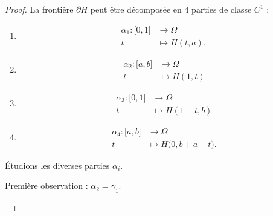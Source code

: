 \begin{proof}
	La frontière \( \partial H\) peut être décomposée en \( 4\) parties de classe \( C^1\) :
	\begin{enumerate}
		\item
		      \begin{equation}
			      \begin{aligned}
				      \alpha_1\colon \mathopen[ 0 , 1 \mathclose] & \to \Omega      \\
				      t                                           & \mapsto H(t,a),
			      \end{aligned}
		      \end{equation}
		\item
		      \begin{equation}
			      \begin{aligned}
				      \alpha_2\colon \mathopen[ a , b \mathclose] & \to \Omega     \\
				      t                                           & \mapsto H(1,t)
			      \end{aligned}
		      \end{equation}
		\item
		      \begin{equation}
			      \begin{aligned}
				      \alpha_3\colon \mathopen[ 0 , 1 \mathclose] & \to \Omega       \\
				      t                                           & \mapsto H(1-t,b)
			      \end{aligned}
		      \end{equation}
		\item
		      \begin{equation}
			      \begin{aligned}
				      \alpha_4\colon \mathopen[ a , b \mathclose] & \to \Omega               \\
				      t                                           & \mapsto H\big(0, b+a-t).
			      \end{aligned}
		      \end{equation}
	\end{enumerate}
	Étudions les diverses parties \( \alpha_i\).
	\begin{subproof}
		Première observation : \( \alpha_2=\gamma_1\).

\end{subproof}
\end{proof}
